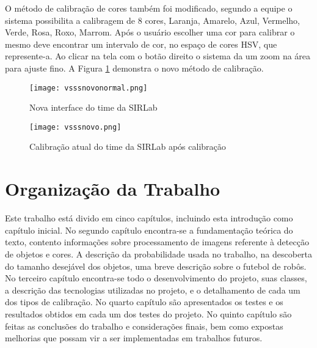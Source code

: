 O método de calibração de cores também foi modificado, segundo a equipe\cite{VSSVision} o sistema possibilita a calibragem de 8 cores, Laranja, Amarelo, Azul, Vermelho, Verde, Rosa, Roxo, Marrom. Após o usuário escolher uma cor para calibrar o mesmo deve encontrar um intervalo de cor, no espaço de cores HSV, que represente-a. Ao clicar na tela com o botão direito o sistema da um zoom na área para ajuste fino. A Figura \ref{SIRLabNovaCalibracao} demonstra o novo método de calibração.
\begin{figure}[H]
\begin{minipage}[H]{0.45\linewidth}
\hspace{0.5cm}
\centering
\texttt{[image: vsssnovonormal.png]}
\caption{Nova interface do time da SIRLab \cite{VSSVision}}
\label{SIRLabNova}
\end{minipage}
\hspace{0.5cm}
\begin{minipage}[H]{0.40\linewidth}
\centering
\texttt{[image: vsssnovo.png]}
\caption{Calibração atual do time da SIRLab \cite{VSSVision} após calibração}
\label{SIRLabNovaCalibracao}
\end{minipage}
\end{figure}	


\section{Organização da Trabalho} \label{Sec:Organizacao}

Este trabalho está divido em cinco capítulos, incluindo esta introdução como capítulo inicial. No segundo capítulo encontra-se a fundamentação teórica do texto, contento informaç\~oes sobre processamento de imagens referente à detecção de objetos e cores. A descrição da probabilidade usada no trabalho, na descoberta do tamanho desejável dos objetos, uma breve descrição sobre o futebol de robôs. No terceiro capítulo encontra-se todo o desenvolvimento do projeto, suas classes, a descrição das tecnologias utilizadas no projeto, e o detalhamento de cada um dos tipos de calibração. No quarto capítulo são apresentados os testes e os resultados obtidos em cada um dos testes do projeto. No quinto capítulo são feitas as conclusões do trabalho e considerações finais, bem como expostas melhorias que possam vir a ser implementadas em trabalhos futuros.
